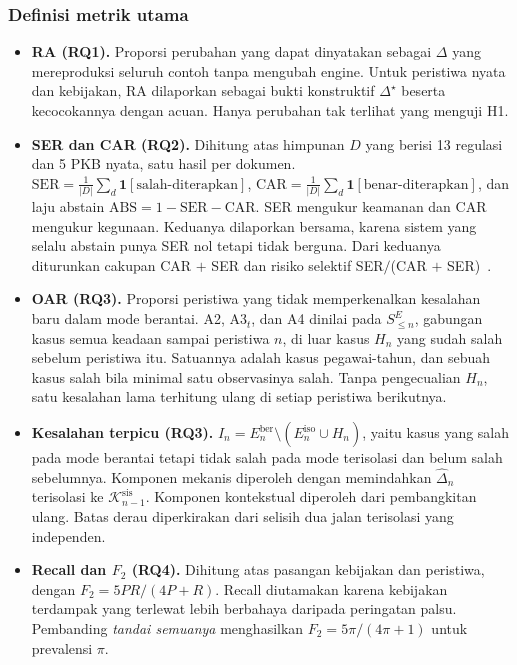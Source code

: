 \documentclass[conference]{IEEEtran}
\makeatletter
\DeclareRobustCommand{\en}[1]{{\usefont{\f@encoding}{\f@family}{\f@series}{it}#1\/}}
\newcommand{\K}{\mathcal{K}}
\newcommand{\emas}{\star}
\newcommand{\SE}{S^{E}}
\makeatother
\begin{document}
\subsubsection{Definisi metrik utama}
\begin{itemize}[leftmargin=*,nosep]
  \item \textbf{RA (RQ1).} Proporsi perubahan yang dapat dinyatakan sebagai $\Delta$ yang mereproduksi seluruh contoh tanpa mengubah \en{engine}. Untuk peristiwa nyata dan kebijakan, RA dilaporkan sebagai bukti konstruktif $\Delta^{\emas}$ beserta kecocokannya dengan acuan. Hanya perubahan tak terlihat yang menguji H1.
  \item \textbf{SER dan CAR (RQ2).} Dihitung atas himpunan $D$ yang berisi 13 regulasi dan 5 PKB nyata, satu hasil per dokumen. $\mathrm{SER} = \frac{1}{|D|}\sum_{d} \mathbf{1}[\text{salah-diterapkan}]$, $\mathrm{CAR} = \frac{1}{|D|}\sum_{d} \mathbf{1}[\text{benar-diterapkan}]$, dan laju \en{abstain} $\mathrm{ABS} = 1 - \mathrm{SER} - \mathrm{CAR}$. SER mengukur keamanan dan CAR mengukur kegunaan. Keduanya dilaporkan bersama, karena sistem yang selalu \en{abstain} punya SER nol tetapi tidak berguna. Dari keduanya diturunkan cakupan CAR $+$ SER dan risiko selektif SER$/$(CAR $+$ SER)~\cite{xin2021abstention}.
  \item \textbf{OAR (RQ3).} Proporsi peristiwa yang tidak memperkenalkan kesalahan baru dalam mode berantai. A2, A3$_t$, dan A4 dinilai pada $\SE_{\leq n}$, gabungan kasus semua keadaan sampai peristiwa $n$, di luar kasus $H_n$ yang sudah salah sebelum peristiwa itu. Satuannya adalah kasus pegawai-tahun, dan sebuah kasus salah bila minimal satu observasinya salah. Tanpa pengecualian $H_n$, satu kesalahan lama terhitung ulang di setiap peristiwa berikutnya.
  \item \textbf{Kesalahan terpicu (RQ3).} $I_n = E^{\mathrm{ber}}_n \setminus (E^{\mathrm{iso}}_n \cup H_n)$, yaitu kasus yang salah pada mode berantai tetapi tidak salah pada mode terisolasi dan belum salah sebelumnya. Komponen mekanis diperoleh dengan memindahkan $\hat{\Delta}_n$ terisolasi ke $\K^{\mathrm{sis}}_{n-1}$. Komponen kontekstual diperoleh dari pembangkitan ulang. Batas derau diperkirakan dari selisih dua jalan terisolasi yang independen.
  \item \textbf{\en{Recall} dan $F_2$ (RQ4).} Dihitung atas pasangan kebijakan dan peristiwa, dengan $F_2 = 5PR/(4P+R)$. \en{Recall} diutamakan karena kebijakan terdampak yang terlewat lebih berbahaya daripada peringatan palsu. Pembanding \emph{tandai semuanya} menghasilkan $F_2 = 5\pi/(4\pi+1)$ untuk prevalensi $\pi$.
\end{itemize}
\end{document}
